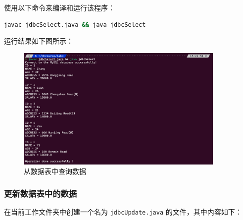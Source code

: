 \documentclass{article}
\renewcommand\tt{\texttt}
\begin{document}
使用以下命令来编译和运行该程序：

\begin{lstlisting}[language=bash]
javac jdbcSelect.java && java jdbcSelect
\end{lstlisting}

运行结果如下图所示：

\begin{figure}[H]
  \centering
  \includegraphics[width=0.9\textwidth]{img/8.png}
  \caption{从数据表中查询数据}
\end{figure}

\subsubsection{更新数据表中的数据}

在当前工作文件夹中创建一个名为 \tt{jdbcUpdate.java} 的文件，其中内容如下：
\end{document}
